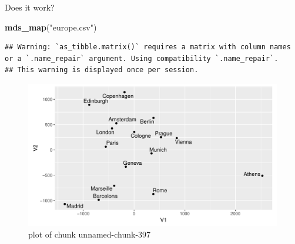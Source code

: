 \documentclass[ignorenonframetext,]{beamer}
\newenvironment{Shaded}{\begin{snugshade}}{\end{snugshade}}
\newcommand{\KeywordTok}[1]{\textcolor[rgb]{0.13,0.29,0.53}{\textbf{#1}}}
\newcommand{\NormalTok}[1]{#1}
\newcommand{\StringTok}[1]{\textcolor[rgb]{0.31,0.60,0.02}{#1}}
\begin{document}
\begin{frame}[fragile]{Does it work?}
\protect\hypertarget{does-it-work}{}

\begin{Shaded}
\begin{Highlighting}[]
\KeywordTok{mds_map}\NormalTok{(}\StringTok{"europe.csv"}\NormalTok{)}
\end{Highlighting}
\end{Shaded}

\begin{verbatim}
## Warning: `as_tibble.matrix()` requires a matrix with column names or a `.name_repair` argument. Using compatibility `.name_repair`.
## This warning is displayed once per session.
\end{verbatim}

\begin{figure}
\centering
\includegraphics{figure/unnamed-chunk-397-1.pdf}
\caption{plot of chunk unnamed-chunk-397}
\end{figure}

\end{frame}
\end{document}
